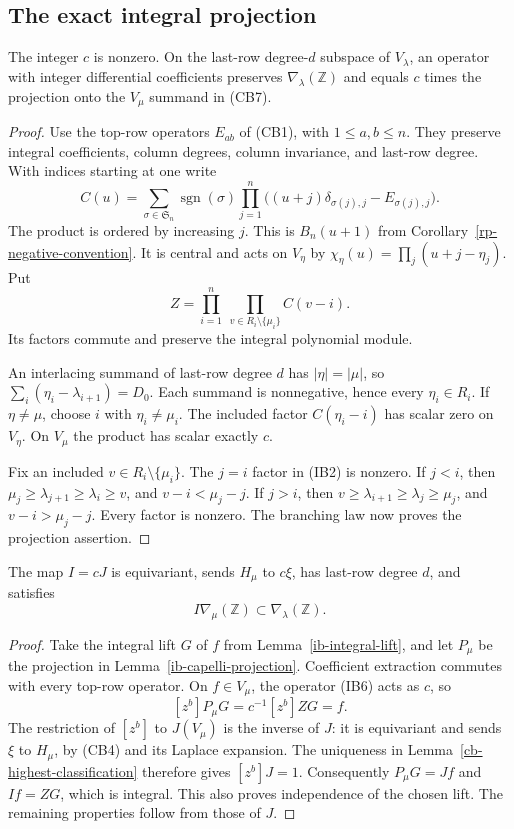 \subsection{The exact integral projection}

\begin{lemma}\label{ib-capelli-projection}
The integer $c$ is nonzero.  On the last-row degree-$d$
subspace of $V_\lambda$, an operator with integer
differential coefficients preserves
$\nabla_\lambda(\mathbb Z)$ and equals $c$ times the
projection onto the $V_\mu$ summand in (CB7).
\end{lemma}
\begin{proof}
Use the top-row operators $E_{ab}$ of (CB1), with
$1\le a,b\le n$.  They preserve integral coefficients,
column degrees, column invariance, and last-row degree.
With indices starting at one write
\[
 C(u)=\sum_{\sigma\in\mathfrak S_n}\operatorname{sgn}(\sigma)
       \prod_{j=1}^n\bigl((u+j)\delta_{\sigma(j),j}
                                         -E_{\sigma(j),j}\bigr).
 \tag{IB5}
\]
The product is ordered by increasing $j$.
This is $B_n(u+1)$ from Corollary~\ref{rp-negative-convention}.
It is central and acts on $V_\eta$ by
$\chi_\eta(u)=\prod_j(u+j-\eta_j)$.
Put
\[
 Z=\prod_{i=1}^n\ \prod_{v\in R_i\setminus\{\mu_i\}} C(v-i).
 \tag{IB6}
\]
Its factors commute and preserve the integral polynomial module.

An interlacing summand of last-row degree $d$ has
$|\eta|=|\mu|$, so
$\sum_i(\eta_i-\lambda_{i+1})=D_0$.
Each summand is nonnegative, hence every $\eta_i\in R_i$.
If $\eta\ne\mu$, choose $i$ with $\eta_i\ne\mu_i$.
The included factor $C(\eta_i-i)$ has scalar zero on
$V_\eta$.  On $V_\mu$ the product has scalar exactly $c$.

Fix an included $v\in R_i\setminus\{\mu_i\}$.
The $j=i$ factor in (IB2) is nonzero.
If $j<i$, then
$\mu_j\ge\lambda_{j+1}\ge\lambda_i\ge v$, and
$v-i<\mu_j-j$.
If $j>i$, then
$v\ge\lambda_{i+1}\ge\lambda_j\ge\mu_j$, and
$v-i>\mu_j-j$.
Every factor is nonzero.
The branching law now proves the projection assertion.
\end{proof}

\begin{theorem}\label{ib-iota-integral}
The map $I=cJ$ is equivariant, sends $H_\mu$ to $c\xi$,
has last-row degree $d$, and satisfies
\[
                    I\nabla_\mu(\mathbb Z)\subset\nabla_\lambda(\mathbb Z).
 \tag{IB7}
\]
\end{theorem}
\begin{proof}
Take the integral lift $G$ of $f$ from
Lemma~\ref{ib-integral-lift}, and let $P_\mu$ be the
projection in Lemma~\ref{ib-capelli-projection}.
Coefficient extraction commutes with every top-row operator.
On $f\in V_\mu$, the operator (IB6) acts as $c$, so
\[
                    [z^b]P_\mu G=c^{-1}[z^b]ZG=f.
\]
The restriction of $[z^b]$ to $J(V_\mu)$ is the inverse
of $J$: it is equivariant and sends $\xi$ to $H_\mu$,
by (CB4) and its Laplace expansion.
The uniqueness in Lemma~\ref{cb-highest-classification}
therefore gives $[z^b]J=1$.
Consequently $P_\mu G=Jf$ and $If=ZG$, which is integral.
This also proves independence of the chosen lift.
The remaining properties follow from those of $J$.
\end{proof}

